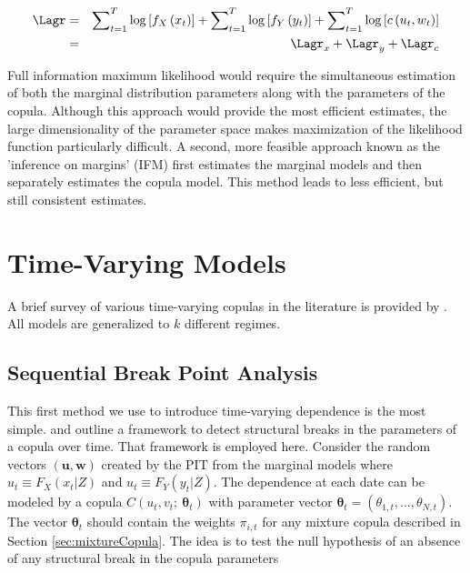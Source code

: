 \begin{eqnarray*}
\Lagr &=& \sum\nolimits_{t=1}^{T}\log \left[f_{X}\left(x_{t}\right)\right] + \sum\nolimits_{t=1}^{T}\log \left[f_{Y}\left(y_{t}\right)\right]
+ \sum\nolimits_{t=1}^{T}\log \left[c\left(u_{t}, w_{t}\right)\right] \\
    &=& \Lagr_{x} + \Lagr_{y} + \Lagr_{c}
\end{eqnarray*}

Full information maximum likelihood would require the simultaneous estimation of both the marginal distribution parameters along with the parameters of the copula. Although this approach would provide the most efficient estimates, the large dimensionality of the parameter space makes maximization of the likelihood function particularly difficult. A second, more feasible approach known as the 'inference on margins' (IFM) first estimates the marginal models and then separately estimates the copula model. This method leads to less efficient, but still consistent estimates.

\section{Time-Varying Models} \label{sec:time_varying_models}

A brief survey of various time-varying copulas in the literature is provided by \cite{Manner_and_Reznikova_2012}. All models are generalized to $k$ different regimes.

\subsection{Sequential Break Point Analysis}

This first method we use to introduce time-varying dependence is the most simple. \cite{Dias_and_Embrechts_2004} and \cite{Dias_and_Embrechts_2009} outline a framework to detect structural breaks in the parameters of a copula over time. That framework is employed here. Consider the random vectors $\left(\boldsymbol{u}, \boldsymbol{w}\right)$ created by the PIT from the marginal models where $u_{t}\equiv F_{X}\left(x_{t}|Z\right)$ and $u_{t}\equiv F_{Y}\left(y_{t} | Z\right)$. The dependence at each date can be modeled by a copula $C\left(u_{t}, v_{t};~\boldsymbol{\theta}_{t}\right)$ with parameter vector $\boldsymbol{\theta}_{t}=(\theta_{1,t},...,\theta_{N,t})$. The vector $\boldsymbol{\theta}_{t}$ should contain the weights $\pi _{i,t}$ for any mixture copula described in Section \ref{sec:mixtureCopula}. The idea is to test the null hypothesis of an absence of any structural break in the copula parameters

